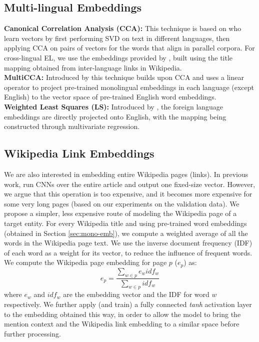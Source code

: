 \documentclass[letterpaper]{article} \usepackage{aaai18}  \usepackage{times}  \usepackage{helvet}  \usepackage{courier}  \usepackage{url}  \usepackage{graphicx}  \frenchspacing  \setlength{\pdfpagewidth}{8.5in}  \setlength{\pdfpageheight}{11in}  \usepackage{latexsym}
\begin{document}
\subsection{Multi-lingual Embeddings}
\textbf{Canonical Correlation Analysis (CCA):} This technique is based on \cite{faruqui2014improving} who learn vectors by first performing SVD on
text in different languages, then applying CCA on pairs of vectors for the 
words that align in parallel corpora. For cross-lingual EL, we use the embeddings provided by \cite{tsai2016cross}, built using the title mapping obtained from inter-language links in Wikipedia.\\
\textbf{MultiCCA:} Introduced by \cite{ammar2016massively} this technique builds upon CCA and uses a linear operator to project pre-trained monolingual embeddings in each language (except English) to the vector space of pre-trained English word embeddings.
\\
\textbf{Weighted Least Squares (LS):} Introduced by \cite{mikolov2013exploiting}, the foreign language embeddings are directly projected onto English, with the mapping being constructed through multivariate regression.
\\
\subsection{Wikipedia Link Embeddings} \label{sec:WikiEmbeddings}
We are also interested in embedding entire Wikipedia pages (links). In previous work, \cite{berkeleyNNEL} run CNNs over the entire article and output one fixed-size vector. However, we argue that this operation is too expensive, and it becomes more expensive for some very long pages (based on our experiments on the validation data). We propose a simpler, less expensive route of modeling the Wikipedia page of a target entity.  For every Wikipedia title and using pre-trained word embeddings (obtained in Section \ref{sec:mono-emb}), we compute a weighted average of all the words in the Wikipedia page text. We use the inverse document frequency (IDF) of each word as a weight for its vector, to reduce the influence of frequent words. We compute the Wikipedia page embedding for page $p$ ($e_p$) as:
\begin{equation}
e_p = \dfrac{\sum_{w \in p}{e_{w}idf_w}}{\sum_{w \in p}{idf_w}}
\end{equation}
where $e_w$ and $idf_w$ are the embedding vector and the IDF for word $w$ respectively. 
We further apply (and train) a fully connected \textit{tanh} activation layer to the embedding obtained this way, in order to allow the model to bring the mention context and the Wikipedia link embedding to a similar space before further processing.
\end{document}
